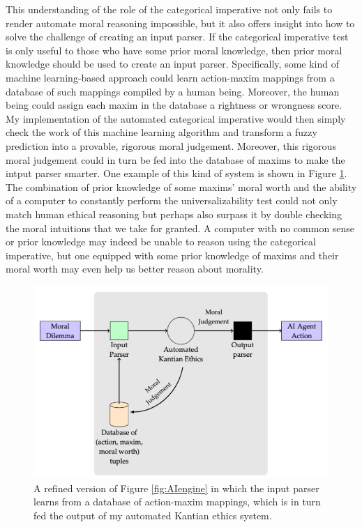 \begin{isabellebody}
\begin{isamarkuptext}
This understanding of the role of the categorical imperative not only fails to render automate moral
reasoning impossible, but it also offers insight into how to solve the challenge of creating an input parser.
If the categorical imperative test is only useful to those who have some prior moral knowledge, then prior moral
knowledge should be used to create an input parser. Specifically, some kind of machine learning-based approach
could learn action-maxim mappings from a database of such mappings compiled by a human being. Moreover, 
the human being could assign each maxim in the database a rightness or wrongness score. My implementation
of the automated categorical imperative would then simply check the work of this machine learning algorithm and transform
a fuzzy prediction into a provable, rigorous moral judgement. Moreover, this rigorous moral judgement
could in turn be fed into the database of maxims to make the intput parser smarter. One example of 
this kind of system is shown in Figure \ref{fig:inputparser}. The combination of 
prior knowledge of some maxims' moral worth and the ability of a computer to constantly perform the
universalizability test could not only match human ethical reasoning but perhaps also surpass it
by double checking the moral intuitions that we take for granted. A computer with no common sense or prior knowledge
may indeed be unable to reason using the categorical imperative, but one equipped with some prior knowledge
of maxims and their moral worth may even help us better reason about morality.%
\end{isamarkuptext}\isamarkuptrue%
%
\begin{figure}
\centering
\includegraphics[scale=0.5]{inputparser.png}
\caption{A refined version of Figure \ref{fig:AIengine} in which the input parser learns from a database
of action-maxim mappings, which is in turn fed the output of my automated Kantian ethics system. } \label{fig:inputparser}
\end{figure}
%
\isadelimtheory
%
\endisadelimtheory
%
\isatagtheory
%
\endisatagtheory
{\isafoldtheory}%
%
\isadelimtheory
%
\endisadelimtheory
%
\end{isabellebody}%
